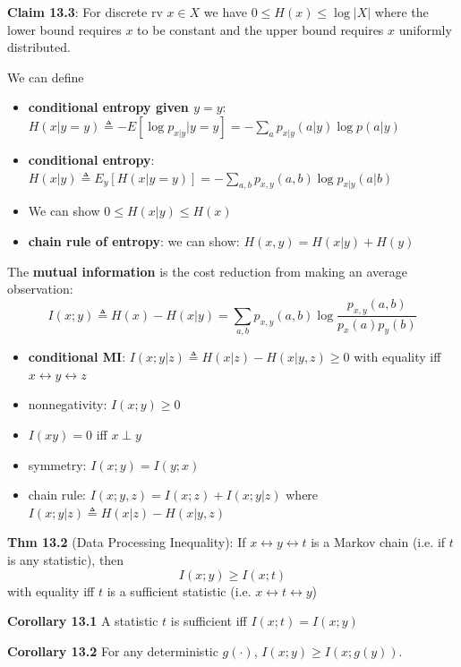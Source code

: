 \documentclass[12pt]{article} %
\begin{document}
\textbf{Claim 13.3}: For discrete rv $x \in X$ we have $0 \leq H(x) \leq \log |X|$ where the lower bound requires $x$ to be constant and the upper bound requires $x$ uniformly distributed.


We can define 
\begin{itemize}[topsep=-1pt, itemsep=-1pt]
    \item \textbf{conditional entropy given $y = y$}: $H(x|y = y) \triangleq - E[\log p_{x|y}|y = y] = - \sum_a p_{x|y}(a|y) \log p(a|y)$
    \item \textbf{conditional entropy}: $H(x|y) \triangleq E_y[H(x|y=y)] = - \sum_{a,b} p_{x,y}(a,b) \log p_{x|y}(a|b)$
    \item We can show $0 \leq H(x | y) \leq H(x)$
    \item \textbf{chain rule of entropy}: we can show: $H(x,y) = H(x|y) + H(y)$
\end{itemize}

The \textbf{mutual information} is the cost reduction from making an average observation:
\begin{equation*}
    I(x;y) \triangleq H(x) - H(x|y) = \sum_{a,b} p_{x,y}(a,b) \log \frac{p_{x,y}(a,b)}{p_x(a) p_y(b)}
\end{equation*}
\begin{itemize}[topsep=-1pt, itemsep=-1pt]
    \item \textbf{conditional MI}: $I(x;y|z) \triangleq H(x|z) - H(x|y,z) \geq 0$ with equality iff $x \leftrightarrow y \leftrightarrow z$
    \item nonnegativity: $I(x;y) \geq 0$
    \item $I(xy) = 0$ iff $x \perp y$
    \item symmetry: $I(x;y) = I(y;x)$
    \item chain rule: $I(x;y,z) = I(x;z) + I(x;y|z)$ where $I(x;y|z) \triangleq H(x|z) - H(x|y,z)$
\end{itemize}


\textbf{Thm 13.2} (Data Processing Inequality): If $x \leftrightarrow y \leftrightarrow t$ is a Markov chain (i.e. if $t$ is any statistic), then $$I(x;y) \geq I(x;t)$$ with equality iff $t$ is a sufficient statistic (i.e. $x \leftrightarrow t \leftrightarrow y$)


\textbf{Corollary 13.1} A statistic $t$ is sufficient iff $I(x;t) = I(x;y)$

\textbf{Corollary 13.2} For any deterministic $g(\cdot)$, $I(x;y) \geq I(x;g(y))$.

\separate
\end{document}
